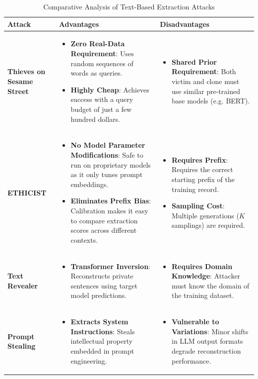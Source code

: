 \documentclass{article}
\begin{document}
\begin{table}[h]
\centering
\caption{Comparative Analysis of Text-Based Extraction Attacks}
\begin{tabular}{p{2.5cm} p{6.25cm} p{6.25cm}}
\toprule
\textbf{Attack} & \textbf{Advantages} & \textbf{Disadvantages} \\
\midrule
\textbf{Thieves on Sesame Street} & 
\begin{itemize}
    \item \textbf{Zero Real-Data Requirement}: Uses random sequences of words as queries.
    \item \textbf{Highly Cheap}: Achieves success with a query budget of just a few hundred dollars.
\end{itemize} & 
\begin{itemize}
    \item \textbf{Shared Prior Requirement}: Both victim and clone must use similar pre-trained base models (e.g. BERT).
\end{itemize} \\
\midrule
\textbf{ETHICIST} & 
\begin{itemize}
    \item \textbf{No Model Parameter Modifications}: Safe to run on proprietary models as it only tunes prompt embeddings.
    \item \textbf{Eliminates Prefix Bias}: Calibration makes it easy to compare extraction scores across different contexts.
\end{itemize} & 
\begin{itemize}
    \item \textbf{Requires Prefix}: Requires the correct starting prefix of the training record.
    \item \textbf{Sampling Cost}: Multiple generations ($K$ samplings) are required.
\end{itemize} \\
\midrule
\textbf{Text Revealer} & 
\begin{itemize}
    \item \textbf{Transformer Inversion}: Reconstructs private sentences using target model predictions.
\end{itemize} & 
\begin{itemize}
    \item \textbf{Requires Domain Knowledge}: Attacker must know the domain of the training dataset.
\end{itemize} \\
\midrule
\textbf{Prompt Stealing} & 
\begin{itemize}
    \item \textbf{Extracts System Instructions}: Steals intellectual property embedded in prompt engineering.
\end{itemize} & 
\begin{itemize}
    \item \textbf{Vulnerable to Variations}: Minor shifts in LLM output formats degrade reconstruction performance.
\end{itemize} \\
\bottomrule
\end{tabular}
\end{table}
\end{document}

